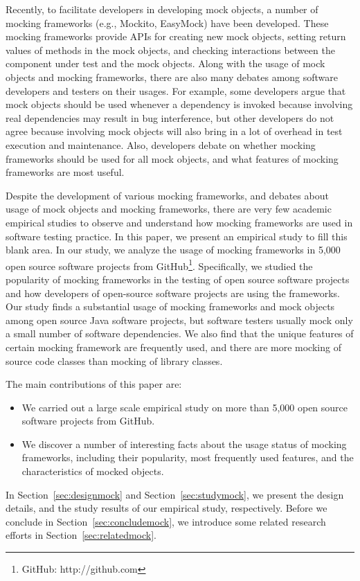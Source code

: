Recently, to facilitate developers in developing mock objects, a number of mocking frameworks (e.g., Mockito, EasyMock) have been developed. These mocking frameworks provide APIs for creating new mock objects, setting return values of methods in the mock objects, and checking interactions between the component under test and the mock objects. Along with the usage of mock objects and mocking frameworks, there are also  many debates among software developers and testers on their usages. For example, some developers argue that mock objects should be used whenever a dependency is invoked because involving real dependencies may result in bug interference, but other developers do not agree because involving mock objects will also bring in a lot of overhead in test execution and maintenance. Also, developers debate on whether mocking frameworks should be used for all mock objects, and what features of mocking frameworks are most useful. 

Despite the development of various mocking frameworks, and debates about usage of mock objects and mocking frameworks, there are very few academic empirical studies to observe and understand how mocking frameworks are used in software testing practice. In this paper, we present an empirical study to fill this blank area. In our study, we analyze the usage of mocking frameworks in 5,000 open source software projects from GitHub\footnote{GitHub: http://github.com}. Specifically, we studied the popularity of mocking frameworks in the testing of open source software projects and how developers of open-source software projects are using the frameworks. Our study finds a substantial usage of mocking frameworks and mock objects among open source Java software projects, but software testers usually mock only a small number of software dependencies. We also find that the unique features of certain mocking framework are frequently used, and there are more mocking of source code classes than mocking of library classes. 
 
The main contributions of this paper are: 
\begin{itemize}
\item We carried out a large scale empirical study on more than 5,000 open source software projects from GitHub. 
\item We discover a number of interesting facts about the usage status of mocking frameworks, including their popularity, most frequently used features, and the characteristics of mocked objects.
\end{itemize}
 
In Section~\ref{sec:designmock} and Section~\ref{sec:studymock}, we present the design details, and the study results of our empirical study, respectively. Before we conclude in Section~\ref{sec:concludemock}, we introduce some related research efforts in Section~\ref{sec:relatedmock}.
